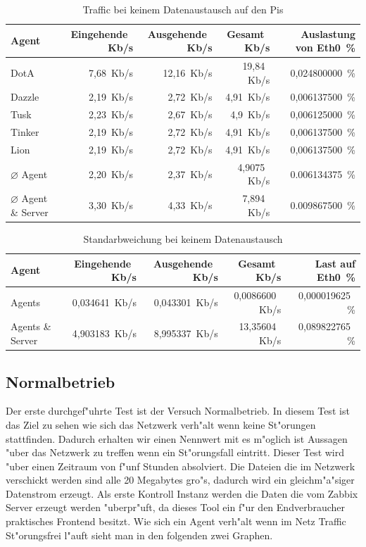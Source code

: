 \begin{table}
\centering
\begin{tabular}{l%
 r<{\,Kb/s}%
 r<{\,Kb/s}%
 r<{\,Kb/s}%
 r<{\,\%}%
}
Agent	  			& Eingehende		& Ausgehende		& Gesamt		& Auslastung von Eth0	\\
\hline
DotA				& 7,68			& 12,16			& 19,84			& 0,024800000 		\\
Dazzle 				& 2,19	 		& 2,72			& 4,91			& 0,006137500 		\\
Tusk 				& 2,23			& 2,67			& 4,9			& 0,006125000		\\
Tinker				& 2,19	 		& 2,72	 		& 4,91	 		& 0,006137500		\\
Lion				& 2,19	 		& 2,72	 		& 4,91  		& 0,006137500		\\
$\diameter $ Agent 		& 2,20			& 2,37			& 4,9075		& 0.006134375		\\   
$\diameter $ Agent \& Server 	& 3,30  		& 4,33			& 7,894			& 0.009867500		\\
\end{tabular}
\caption{Traffic bei keinem Datenaustausch auf den Pis}
\label{tab:noTraffic}
\end{table}

\begin{table}
\centering
\begin{tabular}{l%
 r<{\,Kb/s}%
 r<{\,Kb/s}%
 r<{\,Kb/s}%
 r<{\,\%}%
}
Agent		& Eingehende            & Ausgehende            & Gesamt                & Last auf Eth0 \\
\hline
Agents		& 0,034641              & 0,043301              & 0,0086600             & 0,000019625  \\
Agents \& Server& 4,903183 		& 8,995337        	& 13,35604            	& 0,089822765        \\
\end{tabular}
\caption{Standarbweichung bei keinem Datenaustausch}
\label{tab:standardTrafficAbweichung}
\end{table}


\subsection{Normalbetrieb}
\label{subsec:normalbetrieb}
Der erste durchgef"uhrte Test ist der Versuch Normalbetrieb. In diesem Test ist das Ziel zu sehen wie %
sich das Netzwerk verh"alt wenn keine St"orungen stattfinden. Dadurch erhalten wir einen Nennwert mit es m"oglich ist %
Aussagen "uber das Netzwerk zu treffen wenn ein St"orungsfall eintritt. Dieser Test wird "uber einen Zeitraum von f"unf %
Stunden absolviert. Die Dateien die im Netzwerk verschickt werden sind alle 20 Megabytes gro"s, dadurch wird ein %
gleichm"a"siger Datenstrom erzeugt. Als erste Kontroll Instanz werden die Daten die vom Zabbix Server erzeugt werden %
"uberpr"uft, da dieses Tool ein f"ur den Endverbraucher praktisches Frontend besitzt. Wie sich ein Agent verh"alt %
wenn im Netz Traffic St"orungsfrei l"auft sieht man in den folgenden zwei Graphen.

